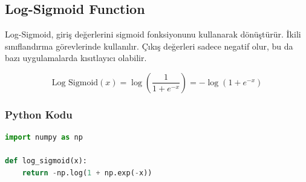 \newpage

\subsection{Log-Sigmoid Function}

Log-Sigmoid, giriş değerlerini sigmoid fonksiyonunu kullanarak dönüştürür. İkili sınıflandırma görevlerinde kullanılır. Çıkış değerleri sadece negatif olur, bu da bazı uygulamalarda kısıtlayıcı olabilir.

\[ \text{Log Sigmoid}(x) = \log\left(\frac{1}{1 + e^{-x}}\right) = -\log(1 + e^{-x}) \]

\subsubsection{Python Kodu}

\begin{lstlisting}[language=Python]
import numpy as np

def log_sigmoid(x):
    return -np.log(1 + np.exp(-x))
\end{lstlisting}

\newpage